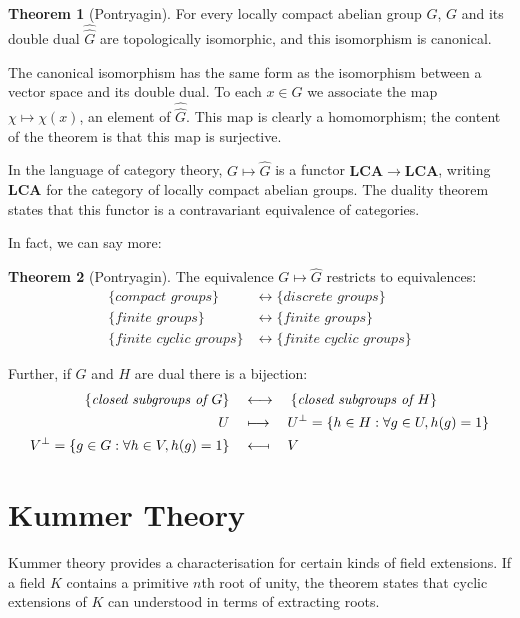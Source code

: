 \documentclass[12pt, a4paper]{article}
\newcommand\longmapsfrom{\mathrel{\reflectbox{\ensuremath{\longmapsto}}}}
\theoremstyle{definition}
\newtheorem{theorem}{Theorem}[section]
\begin{document}
\begin{theorem}[Pontryagin]
For every locally compact abelian group $G$, $G$ and its double dual $\widehat{\widehat{G}}$ are topologically isomorphic, and this isomorphism is canonical.
\end{theorem}

The canonical isomorphism has the same form as the isomorphism between a vector space and its double dual. To each $x \in G$ we associate the map $\chi \mapsto \chi(x)$, an element of $\widehat{\widehat{G}}$. This map is clearly a homomorphism; the content of the theorem is that this map is surjective.

In the language of category theory, $G \mapsto \widehat{G}$ is a functor $\mathbf{LCA} \to \mathbf{LCA}$, writing $\mathbf{LCA}$ for the category of locally compact abelian groups. The duality theorem states that this functor is a contravariant equivalence of categories.

In fact, we can say more:

\begin{theorem}[Pontryagin]
The equivalence $G \mapsto \widehat{G}$ restricts to equivalences:
\begin{align*}
\{\textit{compact groups}\} &\longleftrightarrow \{\textit{discrete groups}\} \\
\{\textit{finite groups}\} &\longleftrightarrow \{\textit{finite groups}\} \\
\{\textit{finite cyclic groups}\} &\longleftrightarrow \{\textit{finite cyclic groups}\}
\end{align*}

Further, if $G$ and $H$ are dual there is a bijection:
\begin{align*}
\{\textit{closed subgroups of } G\} \quad &\longleftrightarrow \quad \{\textit{closed subgroups of } H\} \\
U \quad &\longmapsto \quad U^\bot = \{ h \in H : \forall g \in U, h(g) = 1 \} \\
V^\bot = \{ g \in G : \forall h \in V, h(g) = 1 \} \quad &\longmapsfrom \quad V \\
\end{align*}
\end{theorem}

\section{Kummer Theory}

Kummer theory provides a characterisation for certain kinds of field extensions. If a field $K$ contains a primitive $n$th root of unity, the theorem states that cyclic extensions of $K$ can understood in terms of extracting roots.
\end{document}
